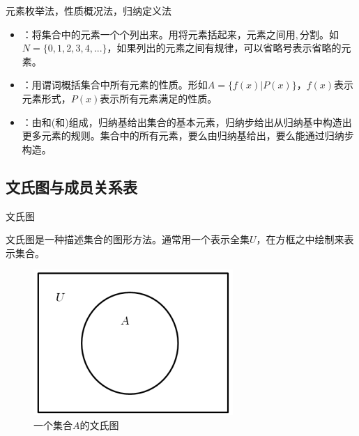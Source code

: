 \documentclass[xetex,10pt,aspectratio=43]{beamer}
\begin{document}
	\begin{frame}{元素枚举法，性质概况法，归纳定义法}
		
		\begin{itemize}
			
			\item<1>\textcolor{red}{}：将集合中的元素一个个列出来。用\textcolor{red}{}将元素括起来，元素之间用$,$分割。如$N=\{0,1,2,3,4,...\}$，如果列出的元素之间有规律，可以省略号表示省略的元素。
			
			\item<1>\textcolor{red}{}：用\textcolor{red}{}谓词概括集合中所有元素的性质。形如$A=\{f(x)|P(x)\}$，$f(x)$表示元素形式，$P(x)$表示所有元素满足的性质。
			
			\item<1>\textcolor{red}{}：由\textcolor{red}{}和\textcolor{red}{}(和\textcolor{red}{})组成，归纳基给出集合的基本元素，归纳步给出从归纳基中构造出更多元素的规则。集合中的所有元素，要么由归纳基给出，要么能通过归纳步构造。
			
		\end{itemize}
	
	\end{frame}
	
	\subsection{文氏图与成员关系表}
	
	\begin{frame}{文氏图}
		
		文氏图是一种描述集合的图形方法。通常用一个\textcolor{red}{}表示全集$U$，在方框之中绘制\textcolor{red}{}来表示集合。
		
		\begin{figure}
			
			\centering
			
			\includegraphics[scale=0.5]{5.png}
			
			\caption{一个集合$A$的文氏图}
			
		\end{figure}
		
	\end{frame}
\end{document}
